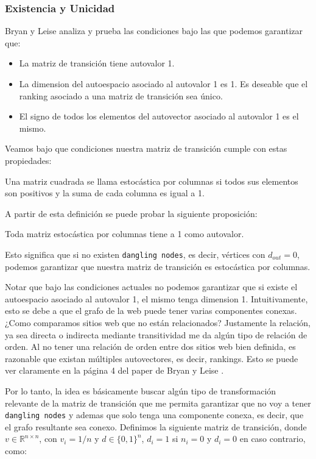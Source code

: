 \pagebreak

\subsubsection{Existencia y Unicidad}

Bryan y Leise \cite{Bryan2006} analiza y prueba las condiciones bajo las que podemos garantizar que:
\begin{itemize}
\item La matriz de transición tiene autovalor 1.
\item La dimension del autoespacio asociado al autovalor 1 es 1. Es deseable que el ranking asociado a una matriz de transición sea único.
\item El signo de todos los elementos del autovector asociado al autovalor 1 es el mismo.
\end{itemize}

Veamos bajo que condiciones nuestra matriz de transición cumple con estas propiedades:

\begin{definition}
Una matriz cuadrada se llama estocástica por columnas si todos sus elementos son positivos y la suma de cada columna es igual a 1.
\end{definition}

A partir de esta definición se puede probar la siguiente proposición:
\begin{proposition}
Toda matriz estocástica por columnas tiene a 1 como autovalor.
\end{proposition}

Esto significa que si no existen \texttt{dangling nodes}, es decir, vértices con $d_{out} = 0$, podemos garantizar que nuestra matriz de transición es estocástica por columnas.

Notar que bajo las condiciones actuales no podemos garantizar que si existe el autoespacio asociado al autovalor 1, el mismo tenga dimension 1. Intuitivamente, esto se debe a que el grafo de la web puede tener varias componentes conexas. ¿Como comparamos sitios web que no están relacionados? Justamente la relación, ya sea directa o indirecta mediante transitividad me da algún tipo de relación de orden. Al no tener una relación de orden entre dos sitios web bien definida, es razonable que existan múltiples autovectores, es decir, rankings. Esto se puede ver claramente en la página 4 del paper de Bryan y Leise \cite{Bryan2006}.

Por lo tanto, la idea es básicamente buscar algún tipo de transformación relevante de la matriz de transición que me permita garantizar que no voy a tener \texttt{dangling nodes} y ademas que solo tenga una componente conexa, es decir, que el grafo resultante sea conexo. Definimos la siguiente matriz de transición, donde $v \in \mathbb{R}^{n \times n}$, con $v_i = 1 / n$ y $d \in \{0,1\}^n$,  $d_i = 1$ si $n_i = 0$ y $d_i = 0$ en caso contrario, como:

